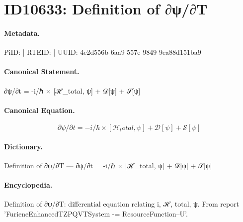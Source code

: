 \section*{ID10633: Definition of ∂ψ/∂T}
\paragraph{Metadata.}
PiID:  | RTEID:  | UUID: 4e2d556b-6aa9-557e-9849-9ea88d151ba9

\paragraph{Canonical Statement.}
∂ψ/∂t = -i/ℏ × [ℋ\_total, ψ] + 𝒟[ψ] + 𝒮[ψ]

\paragraph{Canonical Equation.}
\[
∂ψ/∂t = -i/ℏ × [ℋ_total, ψ] + 𝒟[ψ] + 𝒮[ψ]
\]

\paragraph{Dictionary.}
Definition of ∂ψ/∂T — ∂ψ/∂t = -i/ℏ × [ℋ\_total, ψ] + 𝒟[ψ] + 𝒮[ψ]

\paragraph{Encyclopedia.}
Definition of ∂ψ/∂T: differential equation relating i, ℋ, total, ψ. From report 'FurieneEnhancedTZPQVTSystem -= ResourceFunction--U'.
